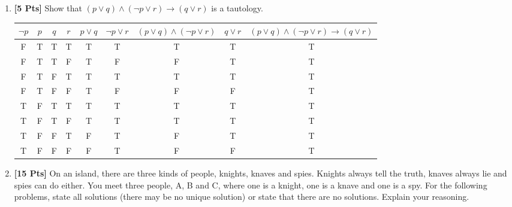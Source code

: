 \begin{enumerate}
\clearpage

\item {\bf [5 Pts]} Show that $(p \vee q) \wedge (\neg p \vee r) \rightarrow (q \vee r)$ is a tautology.
\begin{table}[h]
\centering
\begin{tabular}{|c|c|c|c|c|c|c|c|c|}
\hline
$ \neg p$ & $p$ & $q$ & $r$ & $p \vee q$ & $ \neg p \vee r$ & $(p \vee q) \wedge ( \neg p \vee r)$ & $q \vee r$ & $(p \vee q) \wedge ( \neg p \vee r) \rightarrow (q \vee r)$ \\ \hline
F         & T   & T   & T   & T          & T                & T                                    & T          & T                                                           \\ \hline
F         & T   & T   & F   & T          & F                & F                                    & T          & T                                                           \\ \hline
F         & T   & F   & T   & T          & T                & T                                    & T          & T                                                           \\ \hline
F         & T   & F   & F   & T          & F                & F                                    & F          & T                                                           \\ \hline
T         & F   & T   & T   & T          & T                & T                                    & T          & T                                                           \\ \hline
T         & F   & T   & F   & T          & T                & T                                    & T          & T                                                           \\ \hline
T         & F   & F   & T   & F          & T                & F                                    & T          & T                                                           \\ \hline
T         & F   & F   & F   & F          & T                & F                                    & F          & T                                                           \\ \hline
\end{tabular}
\end{table}

\item {\bf [15 Pts]} On an island, there are three kinds of people, knights, knaves and spies. Knights always tell the truth, knaves always lie and spies can do either. You meet three people, A, B and C, where one is a knight, one is a knave and one is a spy. For the following problems, state all solutions (there may be no unique solution) or state that there are no solutions. Explain your reasoning.


\end{enumerate}
